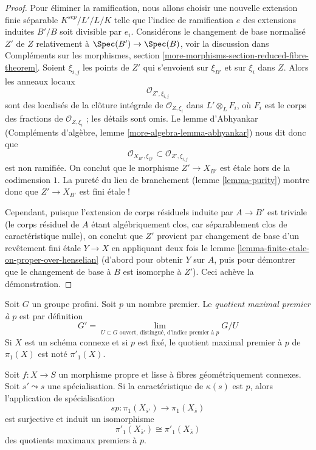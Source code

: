 \begin{proof}
\medskip\noindent
Pour éliminer la ramification, nous allons choisir une nouvelle extension finie
séparable $K^{sep}/L'/L/K$ telle que l'indice de ramification
$e$ des extensions induites $B'/B$ soit divisible par $e_i$.
Considérons le changement de base normalisé $Z'$ de $Z$ relativement à
$\Spec(B') \to \Spec(B)$, voir la discussion dans
Compléments sur les morphismes, section \ref{more-morphisms-section-reduced-fibre-theorem}.
Soient $\xi_{i, j}$ les points de $Z'$ qui s'envoient sur $\xi_{B'}$
et sur $\xi_i$ dans $Z$. Alors les anneaux locaux
$$
\mathcal{O}_{Z', \xi_{i, j}}
$$
sont des localisés de la clôture intégrale de $\mathcal{O}_{Z, \xi_i}$
dans $L' \otimes_L F_i$, où $F_i$ est le corps des fractions de
$\mathcal{O}_{Z, \xi_i}$ ; les détails sont omis. Le lemme d'Abhyankar
(Compléments d'algèbre, lemme \ref{more-algebra-lemma-abhyankar})
nous dit donc que
$$
\mathcal{O}_{X_{B'}, \xi_{B'}} \subset \mathcal{O}_{Z', \xi_{i, j}}
$$
est non ramifiée. On conclut que le morphisme $Z' \to X_{B'}$
est \'etale hors de la codimension $1$. La pureté du
lieu de branchement (lemme \ref{lemma-purity})
montre donc que $Z' \to X_{B'}$ est fini \'etale !

\medskip\noindent
Cependant, puisque l'extension de corps résiduels induite par $A \to B'$
est triviale (le corps résiduel de $A$ étant algébriquement clos,
car séparablement clos de caractéristique nulle),
on conclut que $Z'$ provient par changement de base d'un revêtement fini \'etale
$Y \to X$ en appliquant deux fois le
lemme \ref{lemma-finite-etale-on-proper-over-henselian}
(d'abord pour obtenir $Y$ sur $A$, puis pour démontrer que
le changement de base à $B$ est isomorphe à $Z'$).
Ceci achève la démonstration.
\end{proof}

\noindent
Soit $G$ un groupe profini. Soit $p$ un nombre premier.
Le {\it quotient maximal premier à $p$} est par définition
$$
G' = \lim_{U \subset G\text{ ouvert, distingué, d'indice premier à }p} G/U
$$
Si $X$ est un schéma connexe et si $p$ est fixé, le quotient maximal
premier à $p$ de $\pi_1(X)$ est noté $\pi'_1(X)$.

\begin{theorem}
\label{theorem-specialization-map-isomorphism-prime-to-p}
Soit $f : X \to S$ un morphisme propre et lisse à fibres géométriquement
connexes. Soit $s' \leadsto s$ une spécialisation.
Si la caractéristique de $\kappa(s)$ est $p$, alors l'application de
spécialisation
$$
sp : \pi_1(X_{\overline{s}'}) \to \pi_1(X_{\overline{s}})
$$
est surjective et induit un isomorphisme
$$
\pi'_1(X_{\overline{s}'}) \cong \pi'_1(X_{\overline{s}})
$$
des quotients maximaux premiers à $p$.
\end{theorem}

